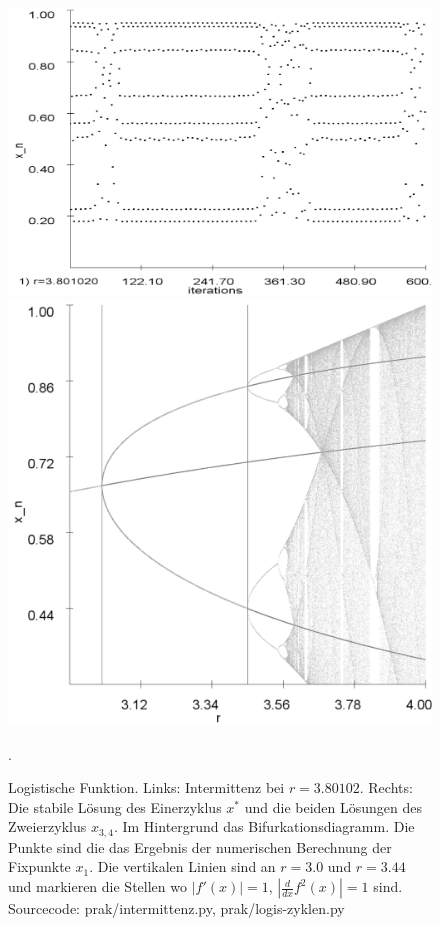 \documentclass[12pt,a4paper]{article}
\begin{document}
\begin{figure}[!htbp]
\centering
\includegraphics[scale=0.22]{intermittenz}
\includegraphics[scale=0.15]{analy-periodenv}
\caption{Logistische Funktion. Links: Intermittenz bei $r=3.80102$. Rechts: Die stabile Lösung des Einerzyklus $x^*$ und die beiden Lösungen des Zweierzyklus $x_{3,4}$. Im Hintergrund das Bifurkationsdiagramm. Die Punkte sind die das Ergebnis der numerischen Berechnung der Fixpunkte $x_1$. Die vertikalen Linien sind an $r=3.0$ und $r=3.44$ und markieren die Stellen wo $|f'(x)|=1$, $|\frac{d}{dx}f^2(x)|=1$ sind. Sourcecode: prak/intermittenz.py, prak/logis-zyklen.py}. 
\label{fig:log-intermittenz-cycles}
\end{figure}
\end{document}
